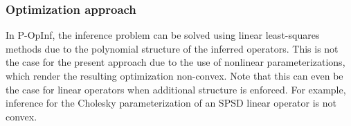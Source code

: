 \documentclass[3p,computermodern,11pt]{elsarticle}
\numberwithin{equation}{section}
\begin{document}
\subsubsection{Optimization approach}
In P-OpInf, the inference problem can be solved using linear least-squares methods due to the polynomial structure of the inferred operators. This is not the case for the present approach due to the use of nonlinear parameterizations, which render the resulting optimization non-convex.  Note that this can even be the case for linear operators when additional structure is enforced.  For example, inference for the Cholesky parameterization of an SPSD linear operator is not convex.

 
\end{document}
